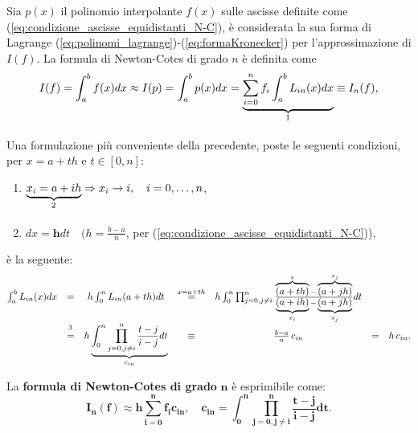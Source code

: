 \begin{definition}
	Sia $p(x)$ il polinomio interpolante $f(x)$ sulle ascisse definite come (\ref{eq:condizione_ascisse_equidistanti_N-C}), è considerata la sua forma di Lagrange (\ref{eq:polinomi_lagrange})-(\ref{eq:formaKronecker}) per l'approssimazione di $I(f)$. La formula di Newton-Cotes di grado $n$ è definita come
	\begin{equation*}
		I(f)=\int_a^b f(x) dx\approx I(p) = \int_a^b p(x)dx=\underbrace{\sum_{i=0}^n f_i\int_a^b L_{in}(x)dx}_{\footnotemark}\equiv I_n(f),
	\end{equation*}
\end{definition}

Una formulazione più conveniente della precedente, poste le seguenti condizioni, per $x=a+th$ e $t\in [0,n]$:
\begin{enumerate}
    \item $\underbrace{x_i=a+ih}_{\footnotemark}\Rightarrow x_i\rightarrow i,\quad i=0,\hdots ,n$,
    \item $dx=\boldsymbol{h}dt\quad (h=\frac{b-a}{n}$, per (\ref{eq:condizione_ascisse_equidistanti_N-C})),
\end{enumerate}
è la seguente:
\begin{equation*}
    \begin{matrix}
        \int_a^b L_{in}(x)dx&=&h\int_0^nL_{in}(a+th)dt&\overset{x=a+th}{=}& h\int_0^n\prod_{j=0,j\neq i}^{n}\frac{\overbrace{(a+th)}^x-\overbrace{(a+jh)}^{x_j}}{\underbrace{(a+ih)}_{x_i}-\underbrace{(a+jh)}_{x_j}}dt\\
        &\overset{\footnotemark}{=}&h\underbrace{\int_0^n\prod_{j=0,j\neq i}^n\frac{t-j}{i-j}dt}_{c_{in}} &\equiv& \frac{b-a}{n}\, c_{in} &=& h\,c_{in}.
    \end{matrix}
\end{equation*}


\begin{definition}
	La \textbf{formula di Newton-Cotes di grado} $\boldsymbol n$ è esprimibile come:
	\begin{equation}\label{eq:formN-C}
	    \boldsymbol{I_n(f)\approx h\sum_{i=0}^n f_ic_{in}},\quad \boldsymbol{c_{in}=\int_0^n\prod_{j=0, j\neq i}^n \frac{t-j}{i-j}dt.}
	\end{equation}
\end{definition}

